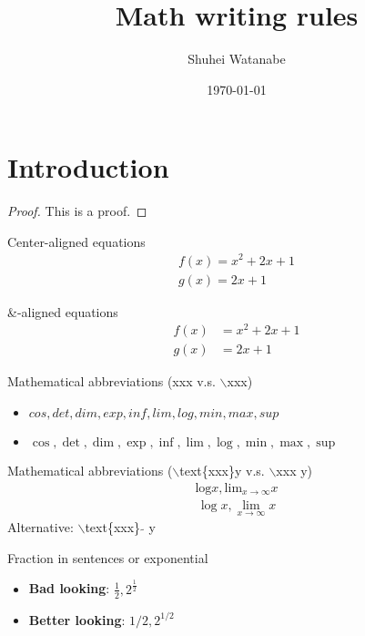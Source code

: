 \documentclass[dvipdfmx]{article}
\title{\vspace{-15mm} Math writing rules}
\author{Shuhei Watanabe}
\date{\today}
\begin{document}
\maketitle
\thispagestyle{fancy}

\section{Introduction}
\begin{proof}
  This is a proof.
\end{proof}

Center-aligned equations
\begin{gather}
  f(x) = x^2 + 2x + 1 \\
  g(x) = 2x + 1
\end{gather}

\&-aligned equations
\begin{equation}
\begin{aligned}
  f(x) &= x^2 + 2x + 1 \\
  g(x) &= 2x + 1
\end{aligned}
\end{equation}

Mathematical abbreviations (xxx v.s. $\backslash$xxx)
\begin{itemize}
  \item $cos, det, dim, exp, inf, lim, log, min, max, sup$
  \item $\cos, \det, \dim, \exp, \inf, \lim, \log, \min, \max, \sup$
\end{itemize}

Mathematical abbreviations ($\backslash$text\{xxx\}y v.s. $\backslash$xxx y)
\begin{equation}
  \begin{aligned}
    \text{log} x, \text{lim}_{x \rightarrow \infty}x
  \end{aligned}
\end{equation}
\begin{equation}
  \begin{aligned}
    \log x, \lim_{x \rightarrow \infty} x
  \end{aligned}
\end{equation}
Alternative: $\backslash$text\{xxx\} $\tilde{}$ y

Fraction in sentences or exponential
\begin{itemize}
  \item \textbf{Bad looking}: $\frac{1}{2}, 2^{\frac{1}{2}}$
  \item \textbf{Better looking}: $1 / 2, 2^{1 / 2}$
\end{itemize}
\end{document}
